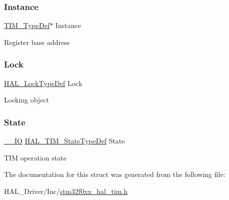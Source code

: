 \subsubsection{\texorpdfstring{Instance}{Instance}}
{\footnotesize\ttfamily \hyperlink{struct_t_i_m___type_def}{T\+I\+M\+\_\+\+Type\+Def}$\ast$ Instance}

Register base address \mbox{\label{struct_t_i_m___handle_type_def_ad4cf225029dbefe8d3fe660c33b8bb6b}} 
\subsubsection{\texorpdfstring{Lock}{Lock}}
{\footnotesize\ttfamily \hyperlink{stm32f0xx__hal__def_8h_ab367482e943333a1299294eadaad284b}{H\+A\+L\+\_\+\+Lock\+Type\+Def} Lock}

Locking object \mbox{\label{struct_t_i_m___handle_type_def_ad4c7388b23a70d7a1a257d6c94df29f3}} 
\subsubsection{\texorpdfstring{State}{State}}
{\footnotesize\ttfamily \hyperlink{core__sc300_8h_aec43007d9998a0a0e01faede4133d6be}{\+\_\+\+\_\+\+IO} \hyperlink{group___t_i_m___exported___types_gae0994cf5970e56ca4903e9151f40010c}{H\+A\+L\+\_\+\+T\+I\+M\+\_\+\+State\+Type\+Def} State}

T\+IM operation state 

The documentation for this struct was generated from the following file\+:\begin{DoxyCompactItemize}
\item 
H\+A\+L\+\_\+\+Driver/\+Inc/\hyperlink{stm32f0xx__hal__tim_8h}{stm32f0xx\+\_\+hal\+\_\+tim.\+h}\end{DoxyCompactItemize}

